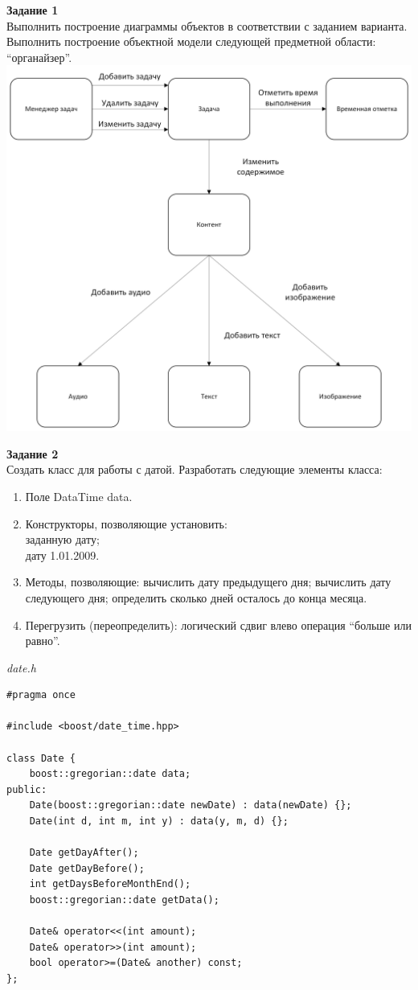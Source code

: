 \documentclass[a4paper,14pt]{extarticle}
\begin{document}
\textbf{Задание 1}\\
Выполнить построение диаграммы объектов в соответствии с заданием варианта.\\
Выполнить
построение объектной
модели следующей
предметной области:
“органайзер”.\\
\includegraphics[width=190mm]{task1}

\textbf{Задание 2}\\
Создать класс для работы с датой.
Разработать следующие элементы
класса:
\begin{enumerate}[label=\asbuk*),ref=\asbuk*]
    \item Поле DataTime data.
    \item Конструкторы, позволяющие
    установить:\\
    заданную дату;\\
    дату 1.01.2009.
    \item Методы, позволяющие:
    вычислить дату предыдущего дня;
    вычислить дату следующего дня;
    определить сколько дней осталось до
    конца месяца.
    \item Перегрузить (переопределить):
    логический сдвиг влево
    операция “больше или равно”.
\end{enumerate}

\textit{date.h}
\begin{verbatim}
#pragma once

#include <boost/date_time.hpp>

class Date {
    boost::gregorian::date data;
public:
    Date(boost::gregorian::date newDate) : data(newDate) {};
    Date(int d, int m, int y) : data(y, m, d) {};

    Date getDayAfter();
    Date getDayBefore();
    int getDaysBeforeMonthEnd();
    boost::gregorian::date getData();

    Date& operator<<(int amount);
    Date& operator>>(int amount);
    bool operator>=(Date& another) const;
};

\end{verbatim}
\end{document}
